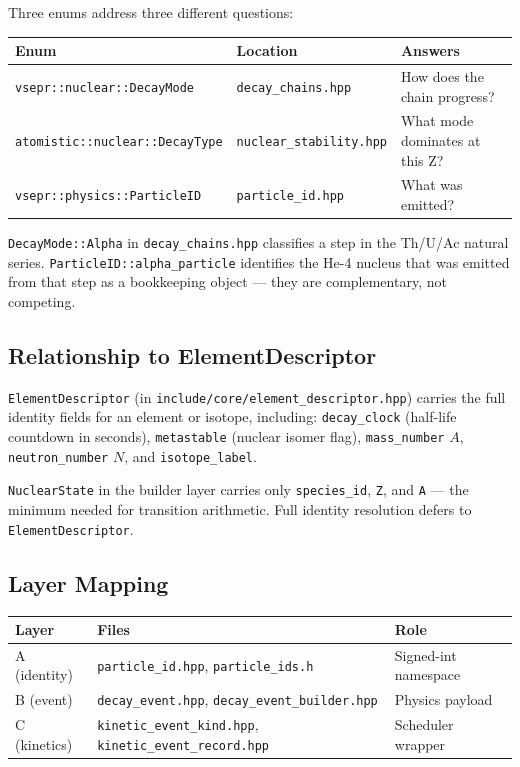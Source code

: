 \documentclass[11pt,a4paper]{article}
\begin{document}
Three enums address three different questions:

\begin{center}
\begin{tabular}{lll}
\toprule
\textbf{Enum} & \textbf{Location} & \textbf{Answers} \\
\midrule
\texttt{vsepr::nuclear::DecayMode}     & \texttt{decay\_chains.hpp}      & How does the chain progress? \\
\texttt{atomistic::nuclear::DecayType} & \texttt{nuclear\_stability.hpp} & What mode dominates at this Z? \\
\texttt{vsepr::physics::ParticleID}    & \texttt{particle\_id.hpp}       & What was emitted? \\
\bottomrule
\end{tabular}
\end{center}

\texttt{DecayMode::Alpha} in \texttt{decay\_chains.hpp} classifies a step
in the Th/U/Ac natural series.  \texttt{ParticleID::alpha\_particle}
identifies the He-4 nucleus that was emitted from that step as a
bookkeeping object --- they are complementary, not competing.

\subsection{Relationship to ElementDescriptor}

\texttt{ElementDescriptor} (in \texttt{include/core/element\_descriptor.hpp})
carries the full identity fields for an element or isotope, including:
\texttt{decay\_clock} (half-life countdown in seconds), \texttt{metastable}
(nuclear isomer flag), \texttt{mass\_number} $A$, \texttt{neutron\_number} $N$,
and \texttt{isotope\_label}.

\texttt{NuclearState} in the builder layer carries only \texttt{species\_id},
\texttt{Z}, and \texttt{A} --- the minimum needed for transition arithmetic.
Full identity resolution defers to \texttt{ElementDescriptor}.

\subsection{Layer Mapping}

\begin{center}
\begin{tabular}{lll}
\toprule
\textbf{Layer} & \textbf{Files} & \textbf{Role} \\
\midrule
A (identity)  & \texttt{particle\_id.hpp}, \texttt{particle\_ids.h} & Signed-int namespace \\
B (event)     & \texttt{decay\_event.hpp}, \texttt{decay\_event\_builder.hpp} & Physics payload \\
C (kinetics)  & \texttt{kinetic\_event\_kind.hpp}, \texttt{kinetic\_event\_record.hpp} & Scheduler wrapper \\
\bottomrule
\end{tabular}
\end{center}
\end{document}
